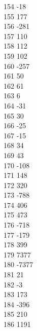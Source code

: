 { 154	-18 \\
 155	177 \\
 156	-281 \\
 157	110 \\
 158	112 \\
 159	102 \\
 160	-257 \\
 161	50 \\
 162	61 \\
 163	6 \\
 164	-31 \\
 165	30 \\
 166	-25 \\
 167	-15 \\
 168	34 \\
 169	43 \\
 170	-108 \\
 171	148 \\
 172	320 \\
 173	-788 \\
 174	406 \\
 175	473 \\
 176	-718 \\
 177	-179 \\
 178	399 \\
 179	7377 \\
 180	-7377 \\
 181	21 \\
 182	-3 \\
 183	173 \\
 184	-396 \\
 185	210 \\
 186	1191 \\
}
